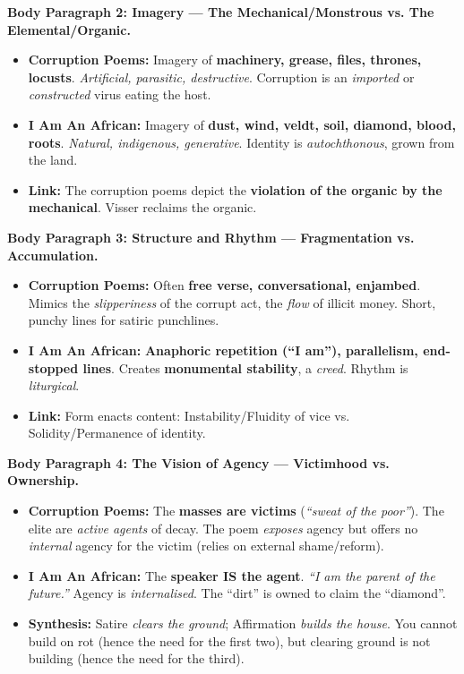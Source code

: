 \documentclass[11pt]{article}
\begin{document}
\begin{exoresolu}
\textbf{Body Paragraph 2: Imagery — The Mechanical/Monstrous vs. The Elemental/Organic.}
\begin{itemize}
    \item \textbf{Corruption Poems:} Imagery of \textbf{machinery, grease, files, thrones, locusts}. \emph{Artificial, parasitic, destructive}. Corruption is an \emph{imported} or \emph{constructed} virus eating the host.
    \item \textbf{I Am An African:} Imagery of \textbf{dust, wind, veldt, soil, diamond, blood, roots}. \emph{Natural, indigenous, generative}. Identity is \emph{autochthonous}, grown from the land.
    \item \textbf{Link:} The corruption poems depict the \textbf{violation of the organic by the mechanical}. Visser reclaims the organic.
\end{itemize}

\textbf{Body Paragraph 3: Structure and Rhythm — Fragmentation vs. Accumulation.}
\begin{itemize}
    \item \textbf{Corruption Poems:} Often \textbf{free verse, conversational, enjambed}. Mimics the \emph{slipperiness} of the corrupt act, the \emph{flow} of illicit money. Short, punchy lines for satiric punchlines.
    \item \textbf{I Am An African:} \textbf{Anaphoric repetition (``I am''), parallelism, end-stopped lines}. Creates \textbf{monumental stability}, a \emph{creed}. Rhythm is \emph{liturgical}.
    \item \textbf{Link:} Form enacts content: Instability/Fluidity of vice vs. Solidity/Permanence of identity.
\end{itemize}

\textbf{Body Paragraph 4: The Vision of Agency — Victimhood vs. Ownership.}
\begin{itemize}
    \item \textbf{Corruption Poems:} The \textbf{masses are victims} (\emph{``sweat of the poor''}). The elite are \emph{active agents} of decay. The poem \emph{exposes} agency but offers no \emph{internal} agency for the victim (relies on external shame/reform).
    \item \textbf{I Am An African:} The \textbf{speaker IS the agent}. \emph{``I am the parent of the future.''} Agency is \emph{internalised}. The ``dirt'' is owned to claim the ``diamond''.
    \item \textbf{Synthesis:} Satire \emph{clears the ground}; Affirmation \emph{builds the house}. You cannot build on rot (hence the need for the first two), but clearing ground is not building (hence the need for the third).
\end{itemize}


\end{exoresolu}
\end{document}
